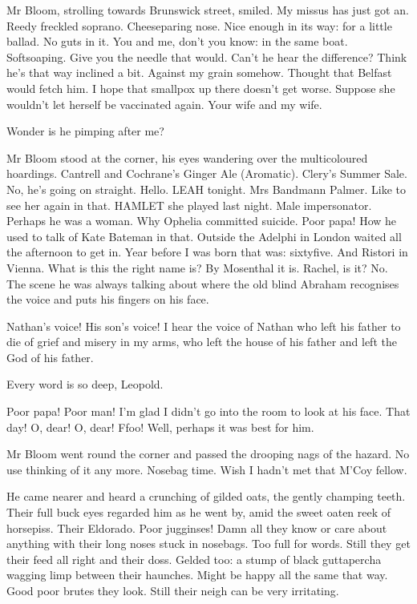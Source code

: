 Mr Bloom, strolling towards Brunswick street, smiled. My missus has just
got an. Reedy freckled soprano. Cheeseparing nose. Nice enough in its
way: for a little ballad. No guts in it. You and me, don't you know: in
the same boat. Softsoaping. Give you the needle that would. Can't he hear
the difference? Think he's that way inclined a bit. Against my grain
somehow. Thought that Belfast would fetch him. I hope that smallpox up
there doesn't get worse. Suppose she wouldn't let herself be vaccinated
again. Your wife and my wife.

Wonder is he pimping after me?

Mr Bloom stood at the corner, his eyes wandering over the multicoloured
hoardings. Cantrell and Cochrane's Ginger Ale (Aromatic). Clery's Summer
Sale. No, he's going on straight. Hello. LEAH tonight. Mrs Bandmann
Palmer. Like to see her again in that. HAMLET she played last night. Male
impersonator. Perhaps he was a woman. Why Ophelia committed suicide. Poor
papa! How he used to talk of Kate Bateman in that. Outside the Adelphi in
London waited all the afternoon to get in. Year before I was born that
was: sixtyfive. And Ristori in Vienna. What is this the right name is? By
Mosenthal it is. Rachel, is it? No. The scene he was always talking about
where the old blind Abraham recognises the voice and puts his fingers on
his face.

Nathan's voice! His son's voice! I hear the voice of Nathan who left his
father to die of grief and misery in my arms, who left the house of his
father and left the God of his father.

Every word is so deep, Leopold.

Poor papa! Poor man! I'm glad I didn't go into the room to look at his
face. That day! O, dear! O, dear! Ffoo! Well, perhaps it was best for
him.

Mr Bloom went round the corner and passed the drooping nags of the
hazard. No use thinking of it any more. Nosebag time. Wish I hadn't met
that M'Coy fellow.

He came nearer and heard a crunching of gilded oats, the gently champing
teeth. Their full buck eyes regarded him as he went by, amid the sweet
oaten reek of horsepiss. Their Eldorado. Poor jugginses! Damn all they
know or care about anything with their long noses stuck in nosebags. Too
full for words. Still they get their feed all right and their doss.
Gelded too: a stump of black guttapercha wagging limp between their
haunches. Might be happy all the same that way. Good poor brutes they
look. Still their neigh can be very irritating.

